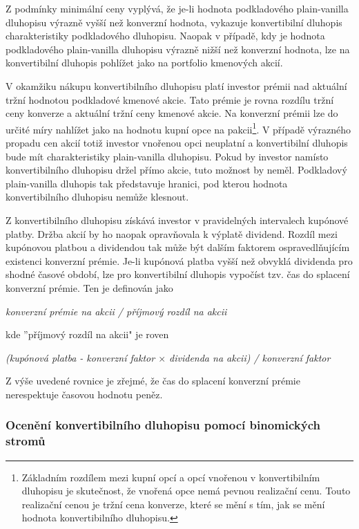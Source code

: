 \documentclass[a4paper]{book}
\begin{document}
Z podmínky minimální ceny vyplývá, že je-li hodnota podkladového plain-vanilla dluhopisu výrazně vyšší než konverzní hodnota, vykazuje konvertibilní dluhopis charakteristiky podkladového dluhopisu. Naopak v případě, kdy je hodnota podkladového plain-vanilla dluhopisu výrazně nižší než konverzní hodnota, lze na konvertibilní dluhopis pohlížet jako na portfolio kmenových akcií.

V okamžiku nákupu konvertibilního dluhopisu platí investor prémii nad aktuální tržní hodnotou podkladové kmenové akcie. Tato prémie je rovna rozdílu tržní ceny konverze a aktuální tržní ceny kmenové akcie. Na konverzní prémii lze do určité míry nahlížet jako na hodnotu kupní opce na pakcii\footnote{Základním rozdílem mezi kupní opcí a opcí vnořenou v konvertibilním dluhopisu je skutečnost, že vnořená opce nemá pevnou realizační cenu. Touto realizační cenou je tržní cena konverze, které se mění s tím, jak se mění hodnota konvertibilního dluhopisu.}. V případě výrazného propadu cen akcií totiž investor vnořenou opci neuplatní a konvertibilní dluhopis bude mít charakteristiky plain-vanilla dluhopisu. Pokud by investor namísto konvertibilního dluhopisu držel přímo akcie, tuto možnost by neměl. Podkladový plain-vanilla dluhopis tak představuje hranici, pod kterou hodnota konvertibilního dluhopisu nemůže klesnout.

Z konvertibilního dluhopisu získává investor v pravidelných intervalech kupónové platby. Držba akcií by ho naopak opravňovala k výplatě dividend. Rozdíl mezi kupónovou platbou a dividendou tak může být dalším faktorem ospravedlňujícím existenci konverzní prémie. Je-li kupónová platba vyšší než obvyklá dividenda pro shodné časové období, lze pro konvertibilní dluhopis vypočíst tzv. čas do splacení konverzní prémie. Ten je definován jako
\begin{center}
\textit{konverzní prémie na akcii / příjmový rozdíl na akcii}
\end{center} 
kde ''příjmový rozdíl na akcii" je roven
\begin{center}
\textit{(kupónová platba - konverzní faktor $\times$ dividenda na akcii) / konverzní faktor}
\end{center}
Z výše uvedené rovnice je zřejmé, že čas do splacení konverzní prémie nerespektuje časovou hodnotu peněz.

\subsubsection{Ocenění konvertibilního dluhopisu pomocí binomických stromů}
\end{document}
